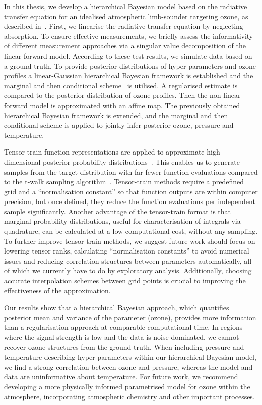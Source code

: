 \vspace{-1ex}
In this thesis, we develop a hierarchical Bayesian model based on the radiative transfer equation for an idealised atmospheric limb-sounder targeting ozone, as described in~\cite{mipas2000handbook}.
First, we linearise the radiative transfer equation by neglecting absorption.
To ensure effective measurements, we briefly assess the informativity of different measurement approaches via a singular value decomposition of the linear forward model.
According to these test results, we simulate data based on a ground truth.
To provide posterior distributions of hyper-parameters and ozone profiles a linear-Gaussian hierarchical Bayesian framework is established and the marginal and then conditional scheme~\cite{fox2016fast} is utilised.
A regularised estimate is compared to the posterior distribution of ozone profiles.
Then the non-linear forward model is approximated with an affine map.
The previously obtained hierarchical Bayesian framework is extended, and the marginal and then conditional scheme is applied to jointly infer posterior ozone, pressure and temperature.

Tensor-train function representations are applied to approximate high-dimensional posterior probability distributions~\cite{cui2022deep, dolgov2020approximation}.
This enables us to generate samples from the target distribution with far fewer function evaluations compared to the t-walk sampling algorithm~\cite{christen2010general}.
Tensor-train methods require a predefined grid and a ``normalisation constant'' so that function outputs are within computer precision, but once defined, they reduce the function evaluations per independent sample significantly.
Another advantage of the tensor-train format is that marginal probability distributions, useful for characterisation of integrals via quadrature, can be calculated at a low computational cost, without any sampling.
To further improve tensor-train methods, we suggest future work should focus on lowering tensor ranks, calculating ``normalisation constants'' to avoid numerical issues and reducing correlation structures between parameters automatically, all of which we currently have to do by exploratory analysis.
Additionally, choosing accurate interpolation schemes between grid points is crucial to improving the effectiveness of the approximation.

Our results show that a hierarchical Bayesian approach, which quantifies posterior mean and variance of the parameter (ozone), provides more information than a regularisation approach at comparable computational time.
In regions where the signal strength is low and the data is noise-dominated, we cannot recover ozone structures from the ground truth.
When including pressure and temperature describing hyper-parameters within our hierarchical Bayesian model, we find a strong correlation between ozone and pressure, whereas the model and data are uninformative about temperature.
For future work, we recommend developing a more physically informed parametrised model for ozone within the atmosphere, incorporating atmospheric chemistry and other important processes.